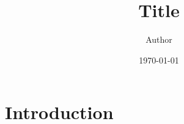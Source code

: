 \documentclass{article}
\title{Title}
\author{Author}
\date{\today}
\begin{document}
\maketitle


\section{Introduction}
\cite{kakade2011efficient}

\printbibliography
\end{document}
